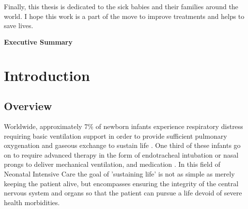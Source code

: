 \documentclass[12pt, openany, oneside]{book}
\newcommand\blankpage{
	\null
	\thispagestyle{empty}
	\addtocounter{page}{-1}
	\newpage
	}
\begin{document}
Finally, this thesis is dedicated to the sick babies and their families around the world. I hope this work is a part of the move to improve treatments and helps to save lives.

\afterpage{\blankpage}





\clearpage
{}
\begin{center}
\vspace*{\fill}
{\Large \bfseries Executive Summary}\\
\end{center}



\vspace*{\fill}


\clearpage
{}
\tableofcontents
\listoffigures
\listoftables


\glsaddall
\setlength{\glsdescwidth}{0.5\linewidth}
\setlength{\glspagelistwidth}{0.1\linewidth}
\printnoidxglossary[type =acronym, sort = letter, title = Abbreviations]


\chapter{Introduction}

\section{Overview}
Worldwide, approximately 7{\%} of newborn infants experience respiratory distress requiring basic ventilation support in order to provide sufficient pulmonary oxygenation and gaseous exchange to sustain life \citep{edwards2013}. One third of these infants go on to require advanced therapy in the form of endotracheal intubation or nasal prongs to deliver mechanical ventilation, and medication \citep{wall2009neonatal}. In this field of Neonatal Intensive Care the goal of 'sustaining life' is not as simple as merely keeping the patient alive, but encompasses ensuring the integrity of the central nervous system and organs so that the patient can pursue a life devoid of severe health morbidities. \\
\end{document}
